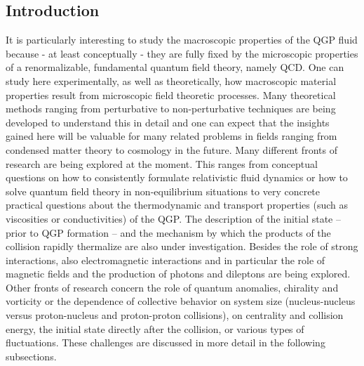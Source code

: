 \subsection{Introduction}

It is particularly interesting to study the macroscopic properties of 
  the QGP fluid because - at least conceptually - they are fully fixed 
  by the microscopic properties of a renormalizable, fundamental quantum 
  field theory, namely QCD. 
One can study here experimentally, as well as theoretically, how 
  macroscopic material properties result from microscopic field 
  theoretic processes. 
Many theoretical methods ranging from perturbative to non-perturbative 
  techniques are being developed to understand this in detail and one can 
  expect that the insights gained here will be valuable for many related 
  problems in fields ranging from condensed matter theory to cosmology in 
  the future.  
Many different fronts of research are being explored at the moment. 
This ranges from conceptual questions on how to consistently formulate 
  relativistic fluid dynamics or how to solve quantum field theory in 
  non-equilibrium situations to very concrete practical questions about 
  the thermodynamic and transport properties (such as viscosities or 
  conductivities) of the QGP. 
The description of the initial state -- prior to QGP formation --
  and the mechanism by which the products of the collision rapidly thermalize
  are also under investigation.
Besides the role of strong interactions, also electromagnetic interactions 
  and in particular the role of magnetic fields and the production of 
  photons and dileptons are being explored. 
Other fronts of research concern the role of quantum anomalies, chirality 
  and vorticity or the dependence of collective behavior on system size 
  (nucleus-nucleus versus proton-nucleus and proton-proton collisions), 
  on centrality and collision energy, the initial state directly after 
  the collision, or various types of fluctuations. 
These challenges are discussed in more detail in the following subsections.





